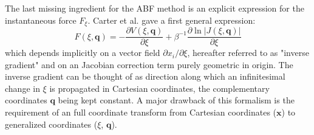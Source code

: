 The last missing ingredient for the ABF method is an explicit expression for the instantaneous force $F_{\xi}$. Carter et al.\autocite{carter1989constrained} gave a first general expression:
\begin{equation}
  F(\xi,\textbf{q}) = -\frac{\partial V(\xi,\textbf{q})}{\partial \xi} + \beta^{-1} \frac{\partial \ln|J(\xi,\textbf{q})|}{\partial\xi} \label{eq:instforce old}
\end{equation}
which depends implicitly on a vector field $\partial x_i / \partial \xi$, hereafter referred to as "inverse gradient" and on an Jacobian correction term purely geometric in origin. The inverse gradient can be thought of as direction along which an infinitesimal change in $\xi$ is propagated in Cartesian coordinates, the complementary coordinates $\textbf{q}$ being kept constant. A major drawback of this formalism is the requirement of an full coordinate transform from Cartesian coordinates ($\textbf{x}$) to generalized coordinates ($\xi$, $\textbf{q}$).

